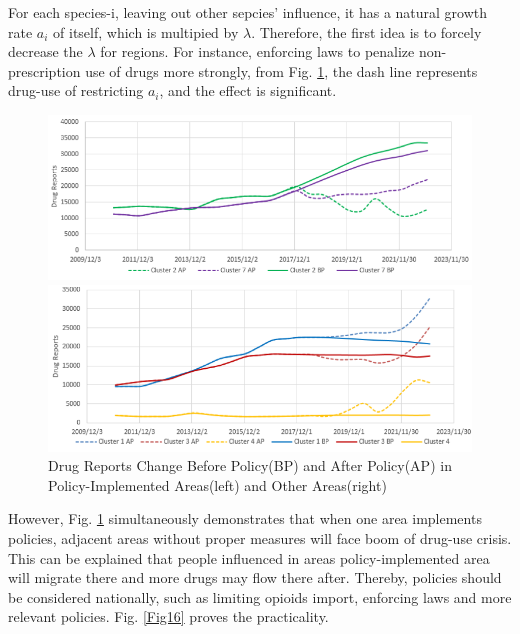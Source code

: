 \documentclass[12pt]{article}
\begin{document}
For each species-i, leaving out other sepcies' influence, it has a natural growth rate $a_{i}$ of itself, which is multipied by $\lambda$. Therefore, the first idea is to forcely decrease the $\lambda$ for regions. For instance, enforcing laws to penalize non-prescription use of drugs more strongly, from Fig. \ref{Fig14}, the dash line represents drug-use of restricting $a_{i}$, and the effect is significant.

\begin{figure}[H]
	\centering %
	\begin{minipage}[b]{0.48\textwidth} %
		\centering %
		\includegraphics[scale=0.6]{./figures/13.png} %
	\end{minipage}
	\begin{minipage}[b]{0.48\textwidth} %
		\centering %
		\includegraphics[scale=0.6]{./figures/14.png}%
	\end{minipage}
	\caption{Drug Reports Change Before Policy(BP) and After Policy(AP) in Policy-Implemented Areas(left) and Other Areas(right)}
	\label{Fig14}
\end{figure}

However, Fig. \ref{Fig14} simultaneously demonstrates that when one area implements policies, adjacent areas without proper measures will face boom of drug-use crisis. This can be explained that people influenced in areas policy-implemented area will migrate there and more drugs may flow there after. Thereby, policies should be considered nationally, such as limiting opioids import, enforcing laws and more relevant policies. Fig. \ref{Fig16} proves the practicality.
\end{document}
